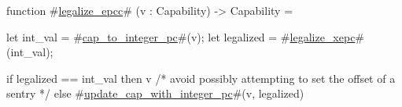 function #\hyperref[sailRISCVzlegalizzezyepcc]{legalize\_epcc}# (v : Capability) -> Capability = {
  let int_val = #\hyperref[sailRISCVzcapzytozyintegerzypc]{cap\_to\_integer\_pc}#(v);
  let legalized = #\hyperref[sailRISCVzlegalizzezyxepc]{legalize\_xepc}#(int_val);

  if   legalized == int_val
  then v /* avoid possibly attempting to set the offset of a sentry */
  else #\hyperref[sailRISCVzupdatezycapzywithzyintegerzypc]{update\_cap\_with\_integer\_pc}#(v, legalized)
}
